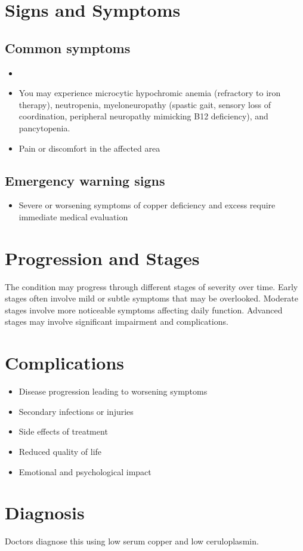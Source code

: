 \section{Signs and Symptoms}
\subsection{Common symptoms}
\begin{itemize}[noitemsep]
  \item \item You may experience microcytic hypochromic anemia (refractory to iron therapy), neutropenia, myeloneuropathy (spastic gait, sensory loss of coordination, peripheral neuropathy mimicking B12 deficiency), and pancytopenia.
  \item Pain or discomfort in the affected area
  \end{itemize}
\subsection{Emergency warning signs}
\begin{itemize}[noitemsep]
  \item Severe or worsening symptoms of copper deficiency and excess require immediate medical evaluation
\end{itemize}
\section{Progression and Stages}
The condition may progress through different stages of severity over time. Early stages often involve mild or subtle symptoms that may be overlooked. Moderate stages involve more noticeable symptoms affecting daily function. Advanced stages may involve significant impairment and complications.
\section{Complications}
\begin{itemize}[noitemsep]
  \item Disease progression leading to worsening symptoms
  \item Secondary infections or injuries
  \item Side effects of treatment
  \item Reduced quality of life
  \item Emotional and psychological impact
\end{itemize}
\section{Diagnosis}
Doctors diagnose this using low serum copper and low ceruloplasmin.

